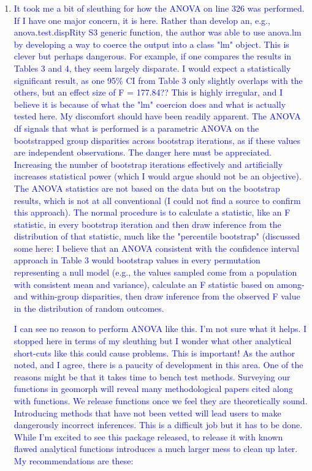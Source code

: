 \documentclass[12pt,letterpaper]{article}
\begin{document}
\begin{enumerate}
\item{\textcolor{blue}{It took me a bit of sleuthing for how the ANOVA on line 326 was performed. 
If I have one major concern, it is here. 
Rather than develop an, e.g., anova.test.dispRity S3 generic function, the author was able to use anova.lm by developing a way to coerce the output into a class "lm" object. 
This is clever but perhaps dangerous. 
For example, if one compares the results in Tables 3 and 4, they seem largely disparate. 
I would expect a statistically significant result, as one 95\% CI from Table 3 only slightly overlaps with the others, but an effect size of F = 177.84?? 
This is highly irregular, and I believe it is because of what the "lm" coercion does and what is actually tested here. 
My discomfort should have been readily apparent. 
The ANOVA df signals that what is performed is a parametric ANOVA on the bootstrapped group disparities across bootstrap iterations, as if these values are independent observations. 
The danger here must be appreciated.
Increasing the number of bootstrap iterations effectively and artificially increases statistical power (which I would argue should not be an objective). 
The ANOVA statistics are not based on the data but on the bootstrap results, which is not at all conventional (I could not find a source to confirm this approach). 
The normal procedure is to calculate a statistic, like an F statistic, in every bootstrap iteration and then draw inference from the distribution of that statistic, much like the "percentile bootstrap" (discussed some here:%
I believe that an ANOVA consistent with the confidence interval approach in Table 3 would bootstrap values in every permutation representing a null model (e.g., the values sampled come from a population with consistent mean and variance), calculate an F statistic based on among- and within-group disparities, then draw inference from the observed F value in the distribution of random outcomes.}}

\textcolor{blue}{I can see no reason to perform ANOVA like this.  I'm not sure what it helps.  I stopped here in terms of my sleuthing but I wonder what other analytical short-cuts like this could cause problems. This is important!  As the author noted, and I agree, there is a paucity of development in this area.  One of the reasons might be that it takes time to bench test methods.  Surveying our functions in geomorph will reveal many methodological papers cited along with functions.  We release functions once we feel they are theoretically sound.  Introducing methods that have not been vetted will lead users to make dangerously incorrect inferences.  This is a difficult job but it has to be done.  While I'm excited to see this package released, to release it with known flawed analytical functions introduces a much larger mess to clean up later.  My recommendations are these:}


\end{enumerate}
\end{document}
